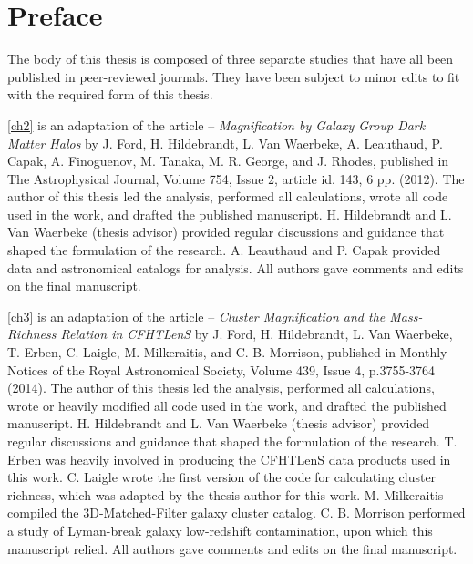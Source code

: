 
\chapter{Preface}
\label{preface}

The body of this thesis is composed of three separate studies that have all been published in peer-reviewed journals. They have been subject to minor edits to fit with the required form of this thesis. 

\autoref{ch2} is an adaptation of the article -- {\it Magnification by Galaxy Group Dark Matter Halos} by J. Ford, H. Hildebrandt, L. Van Waerbeke, A. Leauthaud, P. Capak, A. Finoguenov, M. Tanaka, M. R. George, and J. Rhodes, published in The Astrophysical Journal, Volume 754, Issue 2, article id. 143, 6 pp. (2012). The author of this thesis led the analysis, performed all calculations, wrote all code used in the work, and drafted the published manuscript. H. Hildebrandt and L. Van Waerbeke (thesis advisor) provided regular discussions and guidance that shaped the formulation of the research. A. Leauthaud and P. Capak provided data and astronomical catalogs for analysis. All authors gave comments and edits on the final manuscript.

\autoref{ch3} is an adaptation of the article -- {\it Cluster Magnification and the Mass-Richness Relation in CFHTLenS} by J. Ford, H. Hildebrandt, L. Van Waerbeke, T. Erben, C. Laigle, M. Milkeraitis, and C. B. Morrison, published in Monthly Notices of the Royal Astronomical Society, Volume 439, Issue 4, p.3755-3764 (2014). The author of this thesis led the analysis, performed all calculations, wrote or heavily modified all code used in the work, and drafted the published manuscript. H. Hildebrandt and L. Van Waerbeke (thesis advisor) provided regular discussions and guidance that shaped the formulation of the research. T. Erben was heavily involved in producing the CFHTLenS data products used in this work. C. Laigle wrote the first version of the code for calculating cluster richness, which was adapted by the thesis author for this work. M. Milkeraitis compiled the 3D-Matched-Filter galaxy cluster catalog. C. B. Morrison performed a study of Lyman-break galaxy low-redshift contamination, upon which this manuscript relied. All authors gave comments and edits on the final manuscript.

